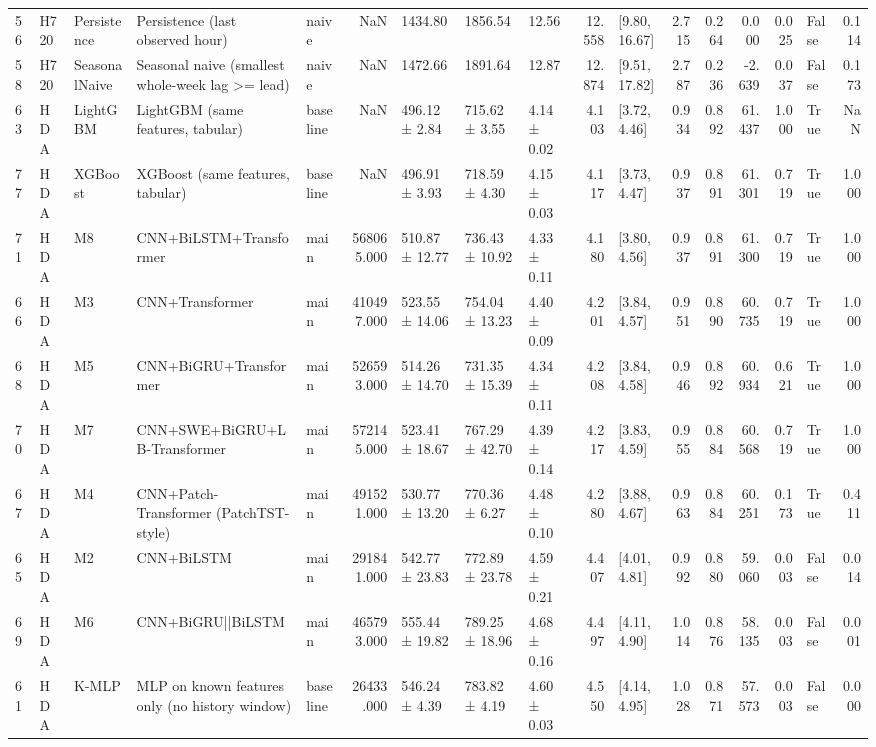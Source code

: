 \begin{tabular}{lllllrlllrlrrrrlr}
56 & H720 & Persistence & Persistence (last observed hour) & naive & NaN & 1434.80 & 1856.54 & 12.56 & 12.558 & [9.80, 16.67] & 2.715 & 0.264 & 0.000 & 0.025 & False & 0.114 \\
58 & H720 & SeasonalNaive & Seasonal naive (smallest whole-week lag >= lead) & naive & NaN & 1472.66 & 1891.64 & 12.87 & 12.874 & [9.51, 17.82] & 2.787 & 0.236 & -2.639 & 0.037 & False & 0.173 \\
63 & HDA & LightGBM & LightGBM (same features, tabular) & baseline & NaN & 496.12 ± 2.84 & 715.62 ± 3.55 & 4.14 ± 0.02 & 4.103 & [3.72, 4.46] & 0.934 & 0.892 & 61.437 & 1.000 & True & NaN \\
77 & HDA & XGBoost & XGBoost (same features, tabular) & baseline & NaN & 496.91 ± 3.93 & 718.59 ± 4.30 & 4.15 ± 0.03 & 4.117 & [3.73, 4.47] & 0.937 & 0.891 & 61.301 & 0.719 & True & 1.000 \\
71 & HDA & M8 & CNN+BiLSTM+Transformer & main & 568065.000 & 510.87 ± 12.77 & 736.43 ± 10.92 & 4.33 ± 0.11 & 4.180 & [3.80, 4.56] & 0.937 & 0.891 & 61.300 & 0.719 & True & 1.000 \\
66 & HDA & M3 & CNN+Transformer & main & 410497.000 & 523.55 ± 14.06 & 754.04 ± 13.23 & 4.40 ± 0.09 & 4.201 & [3.84, 4.57] & 0.951 & 0.890 & 60.735 & 0.719 & True & 1.000 \\
68 & HDA & M5 & CNN+BiGRU+Transformer & main & 526593.000 & 514.26 ± 14.70 & 731.35 ± 15.39 & 4.34 ± 0.11 & 4.208 & [3.84, 4.58] & 0.946 & 0.892 & 60.934 & 0.621 & True & 1.000 \\
70 & HDA & M7 & CNN+SWE+BiGRU+LB-Transformer & main & 572145.000 & 523.41 ± 18.67 & 767.29 ± 42.70 & 4.39 ± 0.14 & 4.217 & [3.83, 4.59] & 0.955 & 0.884 & 60.568 & 0.719 & True & 1.000 \\
67 & HDA & M4 & CNN+Patch-Transformer (PatchTST-style) & main & 491521.000 & 530.77 ± 13.20 & 770.36 ± 6.27 & 4.48 ± 0.10 & 4.280 & [3.88, 4.67] & 0.963 & 0.884 & 60.251 & 0.173 & True & 0.411 \\
65 & HDA & M2 & CNN+BiLSTM & main & 291841.000 & 542.77 ± 23.83 & 772.89 ± 23.78 & 4.59 ± 0.21 & 4.407 & [4.01, 4.81] & 0.992 & 0.880 & 59.060 & 0.003 & False & 0.014 \\
69 & HDA & M6 & CNN+BiGRU||BiLSTM & main & 465793.000 & 555.44 ± 19.82 & 789.25 ± 18.96 & 4.68 ± 0.16 & 4.497 & [4.11, 4.90] & 1.014 & 0.876 & 58.135 & 0.003 & False & 0.001 \\
61 & HDA & K-MLP & MLP on known features only (no history window) & baseline & 26433.000 & 546.24 ± 4.39 & 783.82 ± 4.19 & 4.60 ± 0.03 & 4.550 & [4.14, 4.95] & 1.028 & 0.871 & 57.573 & 0.003 & False & 0.000 \\

\end{tabular}
